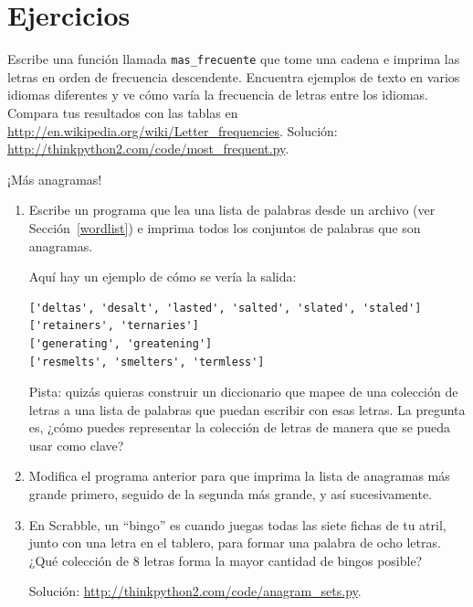 \documentclass[10pt]{book}
\begin{document}
\section{Ejercicios}

\begin{exercise}

Escribe una función llamada \verb"mas_frecuente" que tome una cadena e
imprima las letras en orden de frecuencia descendente.  Encuentra ejemplos
de texto en varios idiomas diferentes y ve cómo varía la frecuencia de letras
entre los idiomas.  Compara tus resultados con las tablas en
\url{http://en.wikipedia.org/wiki/Letter_frequencies}.  Solución:
\url{http://thinkpython2.com/code/most_frequent.py}.   

\end{exercise}


\begin{exercise}
\label{anagramas}

¡Más anagramas!

\begin{enumerate}

\item Escribe un programa
que lea una lista de palabras desde un archivo (ver Sección~\ref{wordlist}) e
imprima todos los conjuntos de palabras que son anagramas.

Aquí hay un ejemplo de cómo se vería la salida:

\begin{verbatim}
['deltas', 'desalt', 'lasted', 'salted', 'slated', 'staled']
['retainers', 'ternaries']
['generating', 'greatening']
['resmelts', 'smelters', 'termless']
\end{verbatim}
%
Pista: quizás quieras construir un diccionario que mapee de una
colección de letras a una lista de palabras que puedan escribir con esas
letras.  La pregunta es, ¿cómo puedes representar la colección de
letras de manera que se pueda usar como clave?

\item Modifica el programa anterior para que imprima la lista de anagramas
más grande primero, seguido de la segunda más grande, y así sucesivamente.

\item En Scrabble, un ``bingo'' es cuando juegas todas las siete fichas de
tu atril, junto con una letra en el tablero, para formar una palabra de ocho
letras.  ¿Qué colección de 8 letras forma la mayor cantidad de bingos posible?


Solución: \url{http://thinkpython2.com/code/anagram_sets.py}.

\end{enumerate}
\end{exercise}
\end{document}
